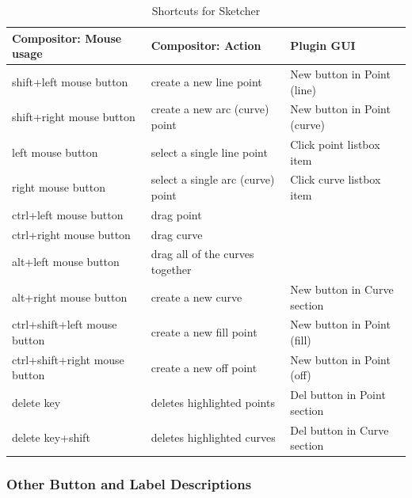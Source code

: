 \begin{table}[h] 
    \caption{Shortcuts for Sketcher}
    \small
    \label{tabular:sketcher}
    \begin{center}
        \begin{tabular}{m{12em}m{12em}m{12em}}
            \toprule
            \textbf{Compositor: Mouse usage} &
            \textbf{Compositor: Action} &
            \textbf{Plugin GUI}\\\midrule
            shift+left mouse button &
            create a new line point &
            New button in Point (line)\\\midrule
            shift+right mouse button &
            create a new arc (curve) point &
            New button in Point (curve)\\\midrule
            left mouse button &
            select a single line point &
            Click point listbox item \\\midrule
            right mouse button &
            select a single arc (curve) point &
            Click curve listbox item \\\midrule
            ctrl+left mouse button &
            drag point & \\\midrule
            ctrl+right mouse button &
            drag curve & \\\midrule
            alt+left mouse button &
            drag all of the curves together & \\\midrule
            alt+right mouse button &
            create a new curve &
            New button in Curve section \\\midrule
            ctrl+shift+left mouse button &
            create a new fill point &
            New button in Point (fill) \\\midrule
            ctrl+shift+right mouse button &
            create a new off point &
            New button in Point (off) \\\midrule
            delete key &
            deletes highlighted points &
            Del button in Point section \\\midrule
            delete key+shift &
            deletes highlighted curves &
            Del button in Curve section \\
            \bottomrule
        \end{tabular}
    \end{center}
\end{table}

\subsubsection*{Other Button and Label Descriptions}%
\label{ssub:other_button_label_description}

